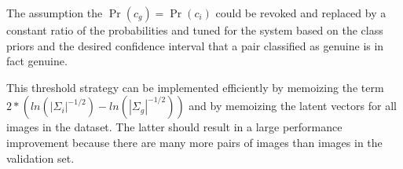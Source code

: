 The assumption the $\Pr(c_g) = \Pr(c_i)$ could be revoked and replaced by a constant ratio of the probabilities and tuned for the system based on the class priors and the desired confidence interval that a pair classified as genuine is in fact genuine.

This threshold strategy can be implemented efficiently by memoizing the term $2 * (ln(|\Sigma_i|^{-1/2}) - ln(|\Sigma_g|^{-1/2}))$ and by memoizing the latent vectors for all images in the dataset.
The latter should result in a large performance improvement because there are many more pairs of images than images in the validation set.
